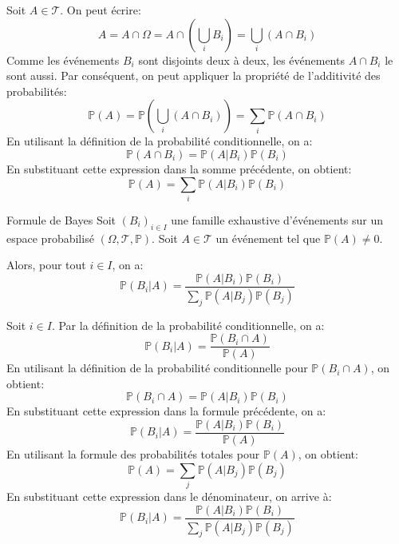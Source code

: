 \documentclass[a4paper,12pt]{article}
\begin{document}
\begin{demonstration}
    Soit $A \in \mathcal{T}$. On peut écrire:
    $$
        A = A \cap \Omega = A \cap \left( \bigcup_{i} B_i \right) = \bigcup_{i} (A \cap B_i)
    $$
    Comme les événements $B_i$ sont disjoints deux à deux, les événements $A \cap B_i$ le sont aussi. Par conséquent, on peut appliquer la propriété de l'additivité des probabilités:
    $$
        \mathbb{P}(A) = \mathbb{P}\left( \bigcup_{i} (A \cap B_i) \right) = \sum_{i} \mathbb{P}(A \cap B_i)
    $$
    En utilisant la définition de la probabilité conditionnelle, on a:
    $$
        \mathbb{P}(A \cap B_i) = \mathbb{P}(A | B_i) \mathbb{P}(B_i)
    $$
    En substituant cette expression dans la somme précédente, on obtient:
    $$
        \mathbb{P}(A) = \sum_{i} \mathbb{P}(A | B_i) \mathbb{P}(B_i)
    $$
\end{demonstration}

\begin{theoreme}{Formule de Bayes}{}
    Soit $(B_i)_{i \in I}$ une famille exhaustive d'événements sur un espace probabilisé $(\Omega, \mathcal{T}, \mathbb{P})$.
    Soit $A \in \mathcal{T}$ un événement tel que $\mathbb{P}(A) \neq 0$.

    Alors, pour tout $i \in I$, on a:
    $$
        \mathbb{P}(B_i | A) = \frac{\mathbb{P}(A | B_i) \mathbb{P}(B_i)}{\sum_{j} \mathbb{P}(A | B_j) \mathbb{P}(B_j)}
    $$
\end{theoreme}

\begin{demonstration}
    Soit $i \in I$. Par la définition de la probabilité conditionnelle, on a:
    $$
        \mathbb{P}(B_i | A) = \frac{\mathbb{P}(B_i \cap A)}{\mathbb{P}(A)}
    $$
    En utilisant la définition de la probabilité conditionnelle pour $\mathbb{P}(B_i \cap A)$, on obtient:
    $$
        \mathbb{P}(B_i \cap A) = \mathbb{P}(A | B_i) \mathbb{P}(B_i)
    $$
    En substituant cette expression dans la formule précédente, on a:
    $$
        \mathbb{P}(B_i | A) = \frac{\mathbb{P}(A | B_i) \mathbb{P}(B_i)}{\mathbb{P}(A)}
    $$
    En utilisant la formule des probabilités totales pour $\mathbb{P}(A)$, on obtient:
    $$
        \mathbb{P}(A) = \sum_{j} \mathbb{P}(A | B_j) \mathbb{P}(B_j)
    $$
    En substituant cette expression dans le dénominateur, on arrive à:
    $$
        \mathbb{P}(B_i | A) = \frac{\mathbb{P}(A | B_i) \mathbb{P}(B_i)}{\sum_{j} \mathbb{P}(A | B_j) \mathbb{P}(B_j)}
    $$
\end{demonstration}
\end{document}
